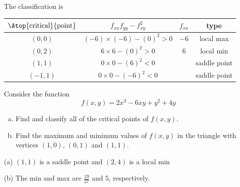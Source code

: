 \begin{solution}
The classification is
\begin{center}
\renewcommand{\arraystretch}{1.3}
     \begin{tabular}{|c|c|c|c|}
     \hline
    $\Atop{\text{critical}}{\text{point}}$  & $f_{xx}f_{yy}-f_{xy}^2$ & 
                                                          $f_{xx}$ & type \\    
    \hline
     $(0,0)$  & $(-6)\times (-6)-(0)^2> 0$ &  $-6$  & local max  \\ \hline
     $(0,2)$  & $6\times 6-(0)^2>0$ & 6 & local min \\  \hline
     $(1,1)$  & $0\times 0-(6)^2<0$ &   & saddle point \\  \hline
     $(-1,1)$  & $0\times 0-(-6)^2<0$ &  & saddle point \\  \hline
     \end{tabular}
\renewcommand{\arraystretch}{1.0}
\end{center}
 \end{solution}

\begin{question}[M200 2004A] %
Consider the function
\begin{equation*}
f(x,y)=2x^3 - 6xy + y^2 +4y 
\end{equation*}
\begin{enumerate}[(a)]
\item  
Find and classify all of the critical points of $f(x,y)$.
\item
Find the maximum and minimum values of $f(x,y)$ in the
triangle with vertices $(1,0)$, $(0,1)$ and $(1,1)$.  
\end{enumerate}
\end{question}

%

\begin{answer}
(a) $(1,1)$ is a saddle point and $(2,4)$ is a local min

(b) The min and max  are $\frac{19}{27}$ and $5$, respectively.
\end{answer}

